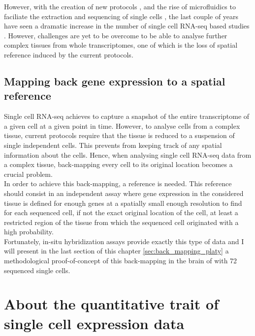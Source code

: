 	However, with the creation of new protocols \cite{ramskold12,tang09}, and the rise of microfluidics to faciliate the extraction and sequencing of single cells \cite{ozsolak10}, the last couple of years have seen a dramatic increase in the number of single cell RNA-seq based studies \cite{islam13,marinov13,yan13,staahlberg13,deng14}. However, challenges are yet to be overcome to be able to analyse further complex tissues from whole transcriptomes, one of which is the loss of spatial reference induced by the current protocols.

  \subsection{Mapping back gene expression to a spatial reference}

	Single cell RNA-seq achieves to capture a snapshot of the entire transcriptome of a given cell at a given point in time. However, to analyse cells from a complex tissue, current protocols require that the tissue is reduced to a suspension of single independent cells. This prevents from keeping track of any spatial information about the cells. Hence, when analysing single cell RNA-seq data from a complex tissue, back-mapping every cell to its original location becomes a crucial problem.\\ 
	
	In order to achieve this back-mapping, a reference is needed. This reference should consist in an independent assay where gene expression in the considered tissue is defined for enough genes at a spatially small enough resolution to find for each sequenced cell, if not the exact original location of the cell, at least a restricted region of the tissue from which the sequenced cell originated with a high probability.\\
	
	Fortunately, in-situ hybridization assays provide exactly this type of data and I will present in the last section of this chapter \ref{sec:back_mapping_platy} a methodological proof-of-concept of this back-mapping in the brain of \platy{} with 72 sequenced single cells.

\section{About the quantitative trait of single cell expression data}\label{sec:quantitative_single_cell}
